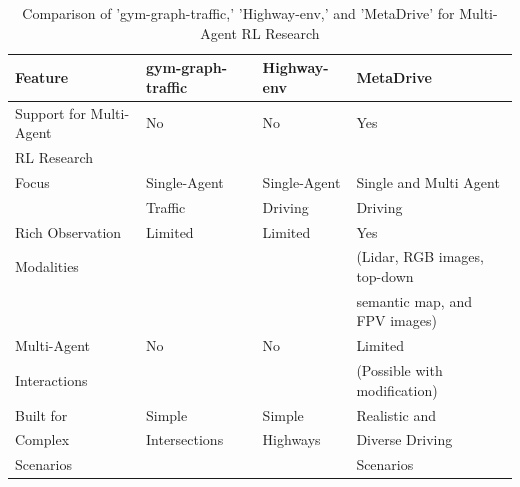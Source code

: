 \begin{table}[H]
    \centering
    \caption{Comparison of 'gym-graph-traffic,' 'Highway-env,' and 'MetaDrive' for Multi-Agent RL Research}
    \label{tab:comparison}
    \begin{tabularx}{\textwidth}{@{}lXXX@{}}
        \toprule
        \multirow{2}{*}{\textbf{Feature}} & \textbf{gym-graph-traffic} & \textbf{Highway-env} & \textbf{MetaDrive}           \\
        \midrule
        Support for Multi-Agent           & No                         & No                   & Yes                           \\
        RL Research                       &                            &                      &                               \\
        \midrule
        Focus                             & Single-Agent               & Single-Agent         & Single and Multi Agent        \\
        & Traffic                    & Driving              & Driving                       \\
        \midrule
        Rich Observation                  & Limited                    & Limited              & Yes                           \\
        Modalities                        &                            &                      & (Lidar, RGB images, top-down  \\
        &                            &                      & semantic map, and FPV images) \\
        \midrule
        Multi-Agent                       & No                         & No                   & Limited                       \\
        Interactions                      &                            &                      & (Possible with modification)  \\
        \midrule
        Built for                         & Simple                     & Simple               & Realistic and                 \\
        Complex                           & Intersections              & Highways             & Diverse Driving               \\
        Scenarios                         &                            &                      & Scenarios                     \\
        \bottomrule
    \end{tabularx}
\end{table}
